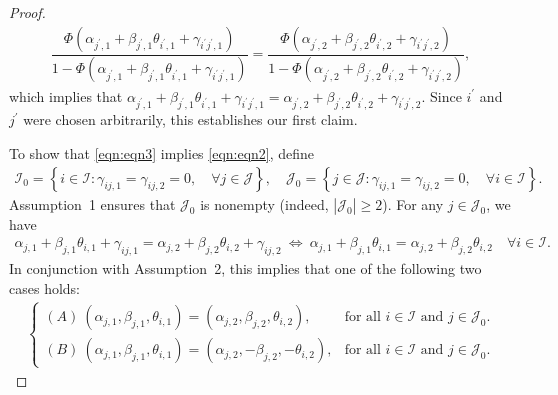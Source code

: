 \documentclass[11pt]{article}
\begin{document}
\begin{proof}
\begin{align*}
    \dfrac{\Phi(\alpha_{j^\prime, 1} + \beta_{j^\prime, 1} \theta_{i^\prime, 1} + \gamma_{i^\prime j^\prime, 1})}{1-\Phi(\alpha_{j^\prime, 1} + \beta_{j^\prime, 1} \theta_{i^\prime, 1} + \gamma_{i^\prime j^\prime, 1})} = \dfrac{\Phi(\alpha_{j^\prime, 2} + \beta_{j^\prime, 2} \theta_{i^\prime, 2} + \gamma_{i^\prime j^\prime, 2})}{1-\Phi(\alpha_{j^\prime, 2} + \beta_{j^\prime, 2} \theta_{i^\prime, 2} + \gamma_{i^\prime j^\prime, 2})},  
    \end{align*}  
    which implies that  
    $
    \alpha_{j^\prime, 1} + \beta_{j^\prime, 1} \theta_{i^\prime, 1} + \gamma_{i^\prime j^\prime, 1} = \alpha_{j^\prime, 2} + \beta_{j^\prime, 2} \theta_{i^\prime, 2} + \gamma_{i^\prime j^\prime, 2}. 
    $
    Since $ i^\prime $ and $ j^\prime $ were chosen arbitrarily, this establishes our first claim. 

    To show that \eqref{eqn:eqn3} implies \eqref{eqn:eqn2}, define
    \begin{align*}
        \mathcal{I}_0 = \left\{ i \in \mathcal{I} : \gamma_{ij, 1} = \gamma_{ij, 2} = 0, \quad \forall j \in \mathcal{J} \right\}, \quad 
        \mathcal{J}_0 = \left\{ j \in \mathcal{J} : \gamma_{ij, 1} = \gamma_{ij, 2} = 0, \quad \forall i \in \mathcal{I} \right\}.
    \end{align*}
    Assumption~1 ensures that $\mathcal{J}_0$ is nonempty (indeed, $|\mathcal{J}_0| \ge 2$). For any $j \in \mathcal{J}_0$, we have
    \begin{align*}
        \alpha_{j,1} + \beta_{j,1} \theta_{i,1} + \gamma_{ij, 1} = \alpha_{j,2} + \beta_{j,2} \theta_{i,2} + \gamma_{ij, 2} 
        ~\Longleftrightarrow~ \alpha_{j,1} + \beta_{j,1} \theta_{i,1} = \alpha_{j,2} + \beta_{j,2} \theta_{i,2} \quad \forall i\in \mathcal{I}.
    \end{align*}
    In conjunction with Assumption~2, this implies that one of the following two cases holds:
    \begin{align}\label{eqn:res1}
    \begin{cases}
        (A)~ (\alpha_{j,1}, \beta_{j,1}, \theta_{i,1}) = (\alpha_{j,2}, \beta_{j,2}, \theta_{i,2}), &\text{for all } i \in \mathcal{I} \text{ and } j \in \mathcal{J}_0. \\ 
        (B)~  (\alpha_{j,1}, \beta_{j,1}, \theta_{i,1}) = (\alpha_{j,2}, -\beta_{j,2}, -\theta_{i,2}),  &\text{for all } i \in \mathcal{I} \text{ and }  j \in \mathcal{J}_0.
    \end{cases}
    \end{align}
    

\end{proof}
\end{document}
